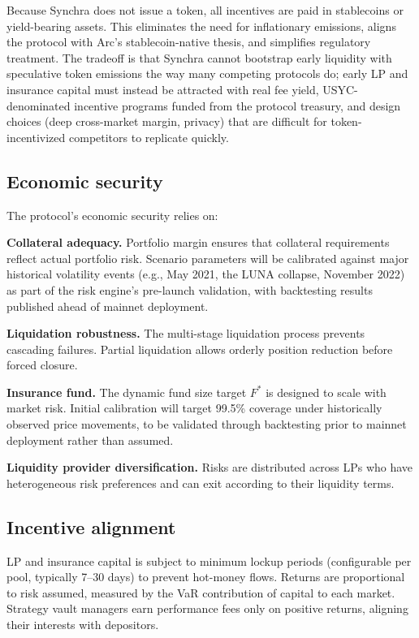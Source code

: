 \documentclass[11pt,a4paper]{article}
\begin{document}
Because Synchra does not issue a token, all incentives are paid in stablecoins or yield-bearing assets. This eliminates the need for inflationary emissions, aligns the protocol with Arc's stablecoin-native thesis, and simplifies regulatory treatment. The tradeoff is that Synchra cannot bootstrap early liquidity with speculative token emissions the way many competing protocols do; early LP and insurance capital must instead be attracted with real fee yield, USYC-denominated incentive programs funded from the protocol treasury, and design choices (deep cross-market margin, privacy) that are difficult for token-incentivized competitors to replicate quickly.

\subsection{Economic security}

The protocol's economic security relies on:

\textbf{Collateral adequacy.} Portfolio margin ensures that collateral requirements reflect actual portfolio risk. Scenario parameters will be calibrated against major historical volatility events (e.g., May 2021, the LUNA collapse, November 2022) as part of the risk engine's pre-launch validation, with backtesting results published ahead of mainnet deployment.

\textbf{Liquidation robustness.} The multi-stage liquidation process prevents cascading failures. Partial liquidation allows orderly position reduction before forced closure.

\textbf{Insurance fund.} The dynamic fund size target $F^*$ is designed to scale with market risk. Initial calibration will target 99.5\% coverage under historically observed price movements, to be validated through backtesting prior to mainnet deployment rather than assumed.

\textbf{Liquidity provider diversification.} Risks are distributed across LPs who have heterogeneous risk preferences and can exit according to their liquidity terms.

\subsection{Incentive alignment}

LP and insurance capital is subject to minimum lockup periods (configurable per pool, typically 7--30 days) to prevent hot-money flows. Returns are proportional to risk assumed, measured by the VaR contribution of capital to each market. Strategy vault managers earn performance fees only on positive returns, aligning their interests with depositors.
\end{document}

